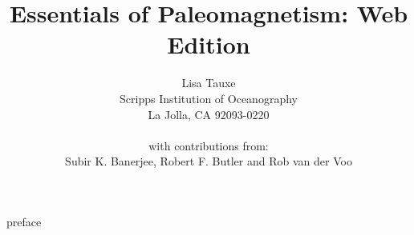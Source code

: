 \documentclass[11pt]{book}
\begin{document}
 
 \title{Essentials of  Paleomagnetism: Web Edition}
 \author{Lisa Tauxe\\Scripps Institution of Oceanography\\La Jolla, CA 92093-0220\\ \\
  with contributions from: \\ Subir K. Banerjee, Robert F. Butler and Rob van der Voo}
 \maketitle

\setcounter{page}{1}
 {preface}
\setcounter{tocdepth}{3}
\tableofcontents
\clearpage
{}
\fancyfoot[C]{\thepage}
\setcounter{page}{1}


%
%
% 
%
%
%  
%
%
%
%
% 
%
% 
%
%


\end{document}
